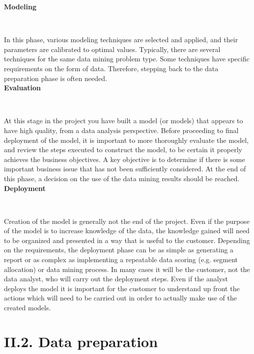 \documentclass[11pt]{report}
\theoremstyle{plain}
\theoremstyle{definition}
\theoremstyle{definition}
\theoremstyle{proposition}
\begin{document}
\textbf{Modeling}

\

In this phase, various modeling techniques are selected and applied, and their parameters are calibrated to optimal values. Typically, there are several techniques for the same data mining problem type. Some techniques have specific requirements on the form of data. Therefore, stepping back to the data preparation phase is often needed.
\\

\textbf{Evaluation}

\

At this stage in the project you have built a model (or models) that appears to have high quality, from a data analysis perspective. Before proceeding to final deployment of the model, it is important to more thoroughly evaluate the model, and review the steps executed to construct the model, to be certain it properly achieves the business objectives. A key objective is to determine if there is some important business issue that has not been sufficiently considered. At the end of this phase, a decision on the use of the data mining results should be reached.
\\

\textbf{Deployment}

\

Creation of the model is generally not the end of the project. Even if the purpose of the model is to increase knowledge of the data, the knowledge gained will need to be organized and presented in a way that is useful to the customer. Depending on the requirements, the deployment phase can be as simple as generating a report or as complex as implementing a repeatable data scoring (e.g. segment allocation) or data mining process. In many cases it will be the customer, not the data analyst, who will carry out the deployment steps. Even if the analyst deploys the model it is important for the customer to understand up front the actions which will need to be carried out in order to actually make use of the created models.
\\



\section*{II.2. Data preparation}

\
\end{document}
